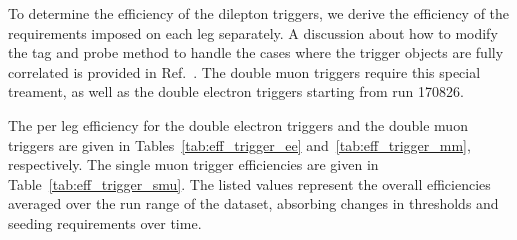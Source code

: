  
To determine the efficiency of the dilepton triggers, we derive the efficiency of the 
requirements imposed on each leg separately. A discussion about how to modify the
tag and probe method to handle the cases where the trigger objects are fully correlated
is provided in Ref.~\cite{HWW2011AN}. The double muon triggers require this special treament, as 
well as the double electron triggers starting from run 170826.

The per leg efficiency for the double electron triggers and the double muon triggers are given in 
Tables~\ref{tab:eff_trigger_ee} and~\ref{tab:eff_trigger_mm}, respectively. The single muon trigger
efficiencies are given in Table~\ref{tab:eff_trigger_smu}.
The listed values represent the overall efficiencies averaged over the run range
of the dataset, absorbing changes in thresholds and seeding requirements over time.
\vspace{10pt}

